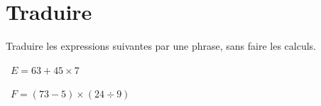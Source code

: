 \begin{questions}
	
%	
\end{questions}


\section{Traduire}
Traduire les expressions suivantes par une phrase, sans faire les calculs.
\begin{questions}
	
	\question[3]  $E = 63 + 45 \times 7$
	\fillwithdottedlines{3cm}
	
	
	\question[3]  $F = (73 - 5) \times (24 \div 9)$
	\fillwithdottedlines{3cm}
\end{questions}